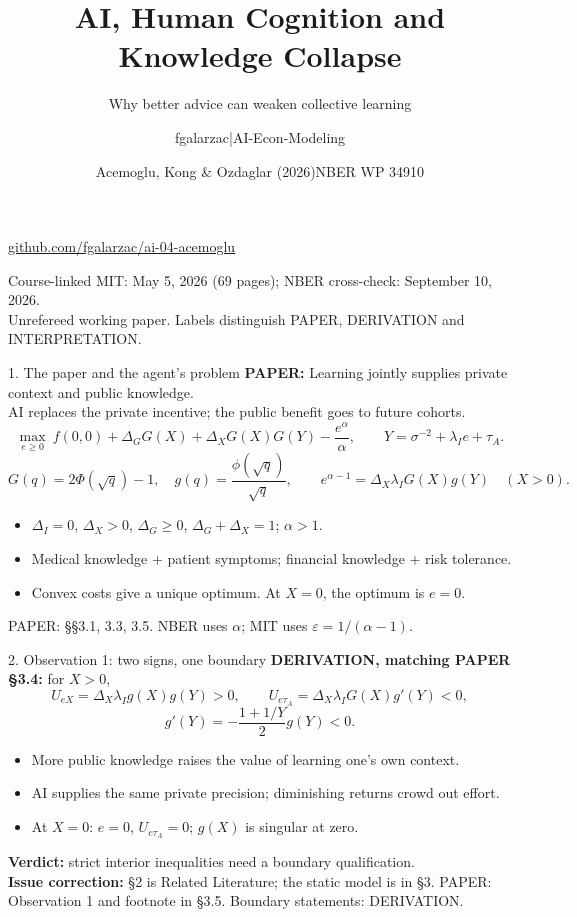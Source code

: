 \documentclass[aspectratio=169,10pt]{beamer}
\title{AI, Human Cognition and Knowledge Collapse}
\subtitle{Why better advice can weaken collective learning}
\author{fgalarzac\quad |\quad AI-Econ-Modeling}
\date{Acemoglu, Kong \& Ozdaglar (2026)\quad NBER WP 34910}
\newcommand{\src}[1]{\vfill{\tiny\color{gray}#1}}
\begin{document}
\begin{frame}[plain]
\titlepage
\centering\small\href{https://github.com/fgalarzac/ai-04-acemoglu}{github.com/fgalarzac/ai-04-acemoglu}
\medskip

\scriptsize Course-linked MIT: May 5, 2026 (69 pages); NBER cross-check: September 10, 2026.\\
Unrefereed working paper. Labels distinguish PAPER, DERIVATION and INTERPRETATION.
\end{frame}

\begin{frame}{1. The paper and the agent's problem}
\textbf{PAPER:} Learning jointly supplies private context and public knowledge.\\
AI replaces the private incentive; the public benefit goes to future cohorts.
\[
\max_{e\ge0}\ f(0,0)+\Delta_GG(X)+\Delta_XG(X)G(Y)-\frac{e^\alpha}{\alpha},
\qquad Y=\sigma^{-2}+\lambda_Ie+\tau_A.
\]
\[
G(q)=2\Phi(\sqrt q)-1,\quad g(q)=\frac{\phi(\sqrt q)}{\sqrt q},\qquad
\boxed{e^{\alpha-1}=\Delta_X\lambda_IG(X)g(Y)}\quad(X>0).
\]
\begin{itemize}
\item $\Delta_I=0$, $\Delta_X>0$, $\Delta_G\ge0$, $\Delta_G+\Delta_X=1$; $\alpha>1$.
\item Medical knowledge + patient symptoms; financial knowledge + risk tolerance.
\item Convex costs give a unique optimum. At $X=0$, the optimum is $e=0$.
\end{itemize}
\src{PAPER: §§3.1, 3.3, 3.5. NBER uses $\alpha$; MIT uses $\varepsilon=1/(\alpha-1)$.}
\end{frame}

\begin{frame}{2. Observation 1: two signs, one boundary}
\textbf{DERIVATION, matching PAPER §3.4:} for $X>0$,
\[
U_{eX}=\Delta_X\lambda_Ig(X)g(Y)>0,
\qquad
U_{e\tau_A}=\Delta_X\lambda_IG(X)g'(Y)<0,
\]
\[
g'(Y)=-\frac{1+1/Y}{2}g(Y)<0.
\]
\begin{itemize}
\item More public knowledge raises the value of learning one's own context.
\item AI supplies the same private precision; diminishing returns crowd out effort.
\item At $X=0$: $e=0$, $U_{e\tau_A}=0$; $g(X)$ is singular at zero.
\end{itemize}
\medskip
\textbf{Verdict:} strict interior inequalities need a boundary qualification.\\
\textbf{Issue correction:} §2 is Related Literature; the static model is in §3.
\src{PAPER: Observation 1 and footnote in §3.5. Boundary statements: DERIVATION.}
\end{frame}
\end{document}
